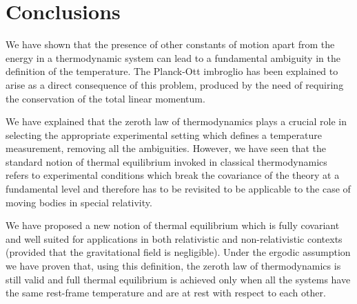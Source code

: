 \documentclass[twocolumn,usenatbib]{mnras2}
\begin{document}
%




\section{Conclusions}

We have shown that the presence of other constants of motion apart from the energy in a thermodynamic system can lead to a fundamental ambiguity in the definition of the temperature. The Planck-Ott imbroglio has been explained to arise as a direct consequence of this problem, produced by the need of requiring the conservation of the total linear momentum.  

We have explained that the zeroth law of thermodynamics plays a crucial role in selecting the appropriate experimental setting which defines a temperature measurement, removing all the ambiguities. However, we have seen that the standard notion of thermal equilibrium invoked in classical thermodynamics refers to experimental conditions which break the covariance of the theory at a fundamental level and therefore has to be revisited to be applicable to the case of moving bodies in special relativity.


We have proposed a new notion of thermal equilibrium which is fully covariant and well suited for applications in both relativistic and non-relativistic contexts (provided that the gravitational field is negligible). Under the ergodic assumption we have proven that, using this definition, the zeroth law of thermodynamics is still valid and full thermal equilibrium is achieved only when all the systems have the same rest-frame temperature and are at rest with respect to each other. 
\end{document}
